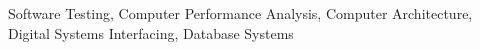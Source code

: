   \item {\footnotesize Software Testing, Computer Performance Analysis, Computer Architecture, Digital Systems Interfacing, Database Systems}


